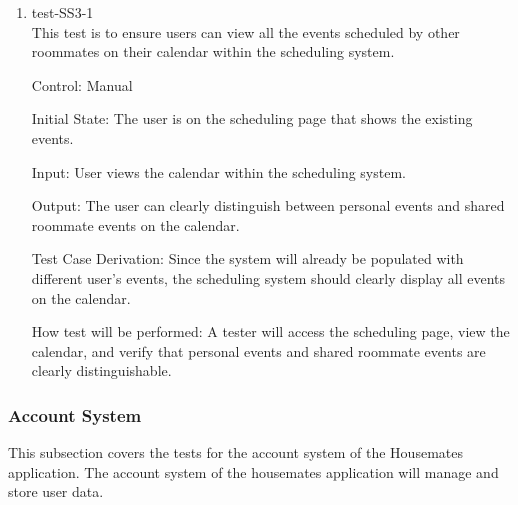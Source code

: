 \documentclass[12pt, titlepage]{article}
\begin{document}
\begin{enumerate}
\item{test-SS3-1\\}
This test is to ensure users can view all the events scheduled by other roommates on their calendar within the scheduling system.

Control: Manual
					
Initial State: The user is on the scheduling page that shows the existing events.
					
Input: User views the calendar within the scheduling system.
					
Output: The user can clearly distinguish between personal events and shared roommate events on the calendar.

Test Case Derivation: Since the system will already be populated with different user's events, the scheduling system should clearly display all events on the calendar.

How test will be performed: A tester will access the scheduling page, view the calendar, and verify that personal events and shared roommate events are clearly distinguishable.

\end{enumerate}

\subsubsection{Account System}

This subsection covers the tests for the account system of the Housemates application. The account system of the housemates application will manage and store user data.
\end{document}
